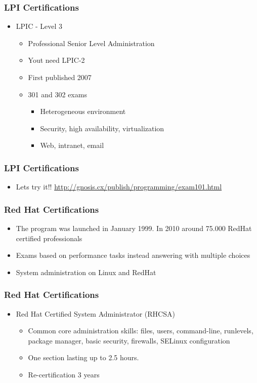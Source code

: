 \documentclass{beamer}
\begin{document}
\begin{frame}
\frametitle{LPI Certifications}
\begin{itemize}

\item LPIC - Level 3
    \begin{itemize}
    \item Professional Senior Level Administration
    \item Yout need LPIC-2
    \item First published 2007 
    \item 301 and 302 exams
	\begin{itemize}
	\item Heterogeneous environment
	\item Security, high availability, virtualization
	\item Web, intranet, email
	\end{itemize}
    \end{itemize}
\end{itemize}
\end{frame}

\begin{frame}
\frametitle{LPI Certifications}
\begin{itemize}

\item Lets try it!! \url{http://gnosis.cx/publish/programming/exam101.html}
\end{itemize}
\end{frame}


\begin{frame}
\frametitle{Red Hat Certifications}
\begin{itemize}
\item The program was launched in January 1999. In 2010 around 75.000 RedHat certified professionals 
\item Exams based on performance tasks instead answering with multiple choices
\item System administration on Linux and RedHat
\end{itemize}
\end{frame}



\begin{frame}
\frametitle{Red Hat Certifications}
\begin{itemize}
\item Red Hat Certified System Administrator (RHCSA)
\begin {itemize}
 \item Common core administration skills: files, users, command-line, runlevels, package manager, basic security, firewalls, SELinux configuration
 \item One section lasting up to 2.5 hours.
 \item Re-certification 3 years
\end {itemize}
\end{itemize}
\end{frame}
\end{document}
